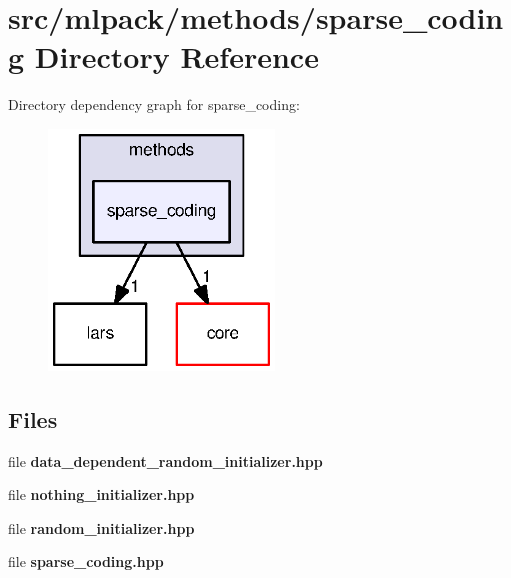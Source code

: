 \section{src/mlpack/methods/sparse\+\_\+coding Directory Reference}
\label{dir_00f0bd3cdd3257def9baafb81b12c5d0}
Directory dependency graph for sparse\+\_\+coding\+:
\nopagebreak
\begin{figure}[H]
\begin{center}
\leavevmode
\includegraphics[width=170pt]{dir_00f0bd3cdd3257def9baafb81b12c5d0_dep}
\end{center}
\end{figure}
\subsection*{Files}
\begin{DoxyCompactItemize}
\item 
file {\bf data\+\_\+dependent\+\_\+random\+\_\+initializer.\+hpp}
\item 
file {\bf nothing\+\_\+initializer.\+hpp}
\item 
file {\bf random\+\_\+initializer.\+hpp}
\item 
file {\bf sparse\+\_\+coding.\+hpp}
\end{DoxyCompactItemize}
